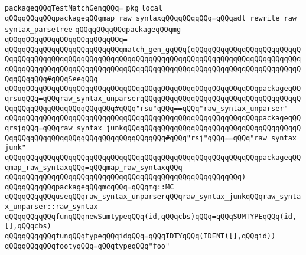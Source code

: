 \label{src/lib/compiler/back/low/tools/match-compiler/test-match-g.pkg}
\verb|packageqQQqTestMatchGenqQQq=|\newline
\verb|pkg|\newline
\newline
\verb|local|\newline
\verb|qQQqqQQqqQQqpackageqQQqmap_raw_syntaxqQQqqQQqqQQq=qQQqadl_rewrite_raw_syntax_parsetree|\newline
\newline
\verb|qQQqqQQqqQQqpackageqQQqmg|\newline
\verb|qQQqqQQqqQQqqQQqqQQqqQQqqQQq=|\newline
\verb|qQQqqQQqqQQqqQQqqQQqqQQqqQQqmatch_gen_gqQQq(qQQqqQQqqQQqqQQqqQQqqQQqqQQqqQQqqQQqqQQqqQQqqQQqqQQqqQQqqQQqqQQqqQQqqQQqqQQqqQQqqQQqqQQqqQQqqQQqqQQqqQQqqQQqqQQqqQQqqQQqqQQqqQQqqQQqqQQqqQQqqQQqqQQqqQQqqQQqqQQqqQQqqQQqqQQqqQQq#qQQqSeeqQQq|\newline
\verb|qQQqqQQqqQQqqQQqqQQqqQQqqQQqqQQqqQQqqQQqqQQqqQQqqQQqqQQqqQQqpackageqQQqrsuqQQq=qQQqraw_syntax_unparserqQQqqQQqqQQqqQQqqQQqqQQqqQQqqQQqqQQqqQQqqQQqqQQqqQQqqQQqqQQqqQQq#qQQq"rsu"qQQq==qQQq"raw_syntax_unparser"|\newline
\verb|qQQqqQQqqQQqqQQqqQQqqQQqqQQqqQQqqQQqqQQqqQQqqQQqqQQqqQQqqQQqpackageqQQqrsjqQQq=qQQqraw_syntax_junkqQQqqQQqqQQqqQQqqQQqqQQqqQQqqQQqqQQqqQQqqQQqqQQqqQQqqQQqqQQqqQQqqQQqqQQqqQQqqQQq#qQQq"rsj"qQQq==qQQq"raw_syntax_junk"|\newline
\verb|qQQqqQQqqQQqqQQqqQQqqQQqqQQqqQQqqQQqqQQqqQQqqQQqqQQqqQQqqQQqpackageqQQqmap_raw_syntaxqQQq=qQQqmap_raw_syntaxqQQq|\newline
\verb|qQQqqQQqqQQqqQQqqQQqqQQqqQQqqQQqqQQqqQQqqQQqqQQqqQQqqQQq)|\newline
\verb|qQQqqQQqqQQqpackageqQQqmcqQQq=qQQqmg::MC|\newline
\newline
\verb|qQQqqQQqqQQquseqQQqraw_syntax_unparserqQQqraw_syntax_junkqQQqraw_syntax_unparser::raw_syntax|\newline
\newline
\verb|qQQqqQQqqQQqfunqQQqnewSumtypeqQQq(id,qQQqcbs)qQQq=qQQqSUMTYPEqQQq(id,[],qQQqcbs)|\newline
\verb|qQQqqQQqqQQqfunqQQqtypeqQQqidqQQq=qQQqIDTYqQQq(IDENT([],qQQqid))|\newline
\newline
\verb|qQQqqQQqqQQqfootyqQQq=qQQqtypeqQQq"foo"|\newline
